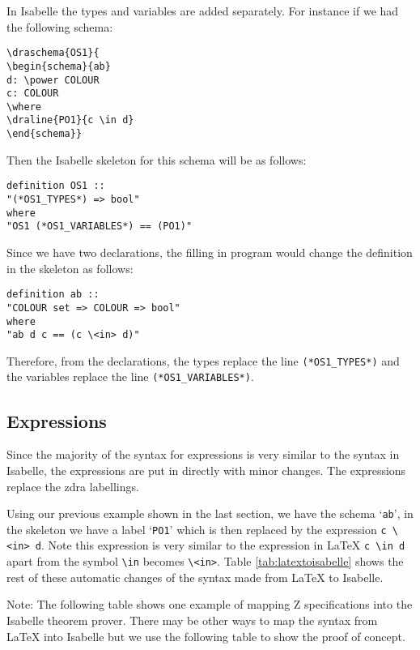 In Isabelle the types and variables are added separately. For instance if we had
the following schema:

\begin{verbatim}
\draschema{OS1}{
\begin{schema}{ab}
d: \power COLOUR
c: COLOUR
\where
\draline{PO1}{c \in d}
\end{schema}}
\end{verbatim}

Then the Isabelle skeleton for this schema will be as follows:

\begin{verbatim}
definition OS1 ::
"(*OS1_TYPES*) => bool"
where
"OS1 (*OS1_VARIABLES*) == (PO1)"
\end{verbatim}

Since we have two declarations, the filling in program would change the
definition in the skeleton as follows:

\begin{verbatim}
definition ab ::
"COLOUR set => COLOUR => bool"
where
"ab d c == (c \<in> d)"
\end{verbatim}

Therefore, from the declarations, the types replace the line
\verb|(*OS1_TYPES*)| and the variables replace the line
\verb|(*OS1_VARIABLES*)|.

\subsection{Expressions}

Since the majority of the syntax for expressions is very similar to the syntax
in Isabelle, the expressions are put in directly with minor changes. The
expressions replace the \gls{zdra} labellings.

Using our previous example shown in the last section, we have the schema
`\texttt{ab}', in the skeleton we have a label `\texttt{PO1}' which is then
replaced by the expression \verb|c \<in> d|. Note this expression is very
similar to the expression in \LaTeX{} \verb|c \in d| apart from the symbol
\verb|\in| becomes \verb|\<in>|. Table \ref{tab:latextoisabelle} shows the rest
of these automatic changes of the syntax made from \LaTeX{} to Isabelle.

Note: The following table shows one example of mapping Z specifications into the
Isabelle theorem prover. There may be other ways to map the syntax from \LaTeX{}
into Isabelle but we use the following table to show the proof of concept.

